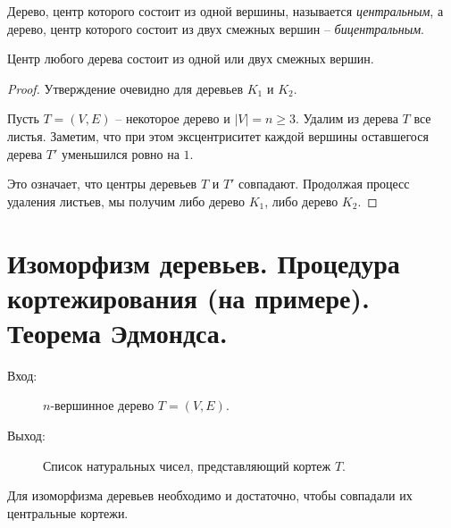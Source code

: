 \begin{definition}
    Дерево, центр которого состоит из одной вершины, называется \emph{центральным}, а дерево, центр которого состоит из двух смежных вершин -- \emph{бицентральным}.
\end{definition}

\begin{theorem}[Жордан]
    Центр любого дерева состоит из одной или двух смежных вершин.
\end{theorem}

\begin{proof}
    Утверждение очевидно для деревьев $ K_1 $ и $ K_2 $.

    Пусть $ T = (V,E) $ -- некоторое дерево и $ | V | = n \geqslant 3 $. Удалим из дерева $ T $ все листья. Заметим, что при этом эксцентриситет каждой вершины оставшегося дерева $ T' $ уменьшился ровно на $ 1 $.

    Это означает, что центры деревьев $ T $ и $ T' $ совпадают. Продолжая процесс удаления листьев, мы получим либо дерево $ K_1 $, либо дерево $ K_2 $.
\end{proof}

\section{Изоморфизм деревьев. Процедура кортежирования (на примере). Теорема Эдмондса.}

\begin{note}\leavevmode
    \begin{description}
        \item[Вход:] $ n $-вершинное дерево $ T = (V,E) $.
        \item[Выход:] Список натуральных чисел, представляющий кортеж $ T $.
    \end{description}
    \begin{figure}[H]
        \centering
        \label{fig:fig_26}
    \end{figure}
\end{note}

\begin{theorem}[Эдмондс]
    Для изоморфизма деревьев необходимо и достаточно, чтобы совпадали их центральные кортежи.
\end{theorem}

